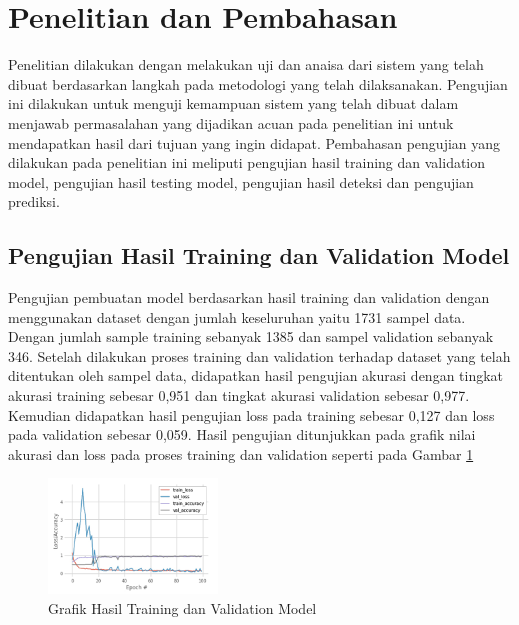 \section{Penelitian dan Pembahasan}
\label{sec:PenelitianPembahasan}

Penelitian dilakukan dengan melakukan uji dan anaisa dari sistem yang telah dibuat berdasarkan langkah pada metodologi yang telah dilaksanakan. Pengujian ini dilakukan untuk menguji kemampuan sistem yang telah dibuat dalam menjawab permasalahan yang dijadikan acuan pada penelitian ini untuk mendapatkan hasil dari tujuan yang ingin didapat. Pembahasan pengujian yang dilakukan pada penelitian ini meliputi pengujian hasil training dan validation model, pengujian hasil testing model, pengujian hasil deteksi dan pengujian prediksi.

\subsection{Pengujian Hasil Training dan Validation Model}
\label{subsec:PengujianTrainingValidation}

Pengujian pembuatan model berdasarkan hasil training dan validation dengan menggunakan dataset dengan jumlah keseluruhan yaitu 1731 sampel data. Dengan jumlah sample training sebanyak 1385 dan sampel validation sebanyak 346. Setelah dilakukan proses training dan validation terhadap dataset yang telah ditentukan oleh sampel data, didapatkan hasil pengujian akurasi dengan tingkat akurasi training sebesar 0,951 dan tingkat akurasi validation sebesar 0,977. Kemudian didapatkan hasil pengujian loss pada training sebesar 0,127 dan loss pada validation sebesar 0,059. Hasil pengujian ditunjukkan pada grafik nilai akurasi dan loss pada proses training dan validation seperti pada Gambar \ref{fig:GrafikTrainingValidation}

\begin{figure} [ht]
  \centering
  \includegraphics[width=0.4\textwidth]{gambar/hasil training dan validation w.jpg}
  \caption{Grafik Hasil Training dan Validation Model}
  \label{fig:GrafikTrainingValidation}
\end{figure}

